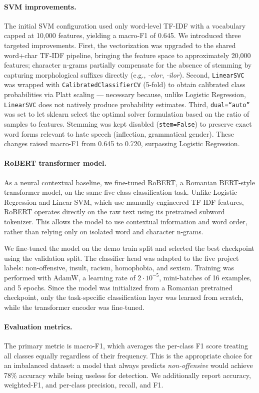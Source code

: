\paragraph{SVM improvements.}
The initial SVM configuration used only word-level TF-IDF with a vocabulary capped at 10,000 features, yielding a macro-F1 of 0.645. We introduced three targeted improvements. First, the vectorization was upgraded to the shared word+char TF-IDF pipeline, bringing the feature space to approximately 20,000 features; character n-grams partially compensate for the absence of stemming by capturing morphological suffixes directly (e.g., \textit{-elor}, \textit{-ilor}). Second, \texttt{LinearSVC} was wrapped with \texttt{CalibratedClassifierCV} (5-fold) to obtain calibrated class probabilities via Platt scaling — necessary because, unlike Logistic Regression, \texttt{LinearSVC} does not natively produce probability estimates. Third, \texttt{dual=``auto''} was set to let sklearn select the optimal solver formulation based on the ratio of samples to features. Stemming was kept disabled (\texttt{stem=False}) to preserve exact word forms relevant to hate speech (inflection, grammatical gender). These changes raised macro-F1 from 0.645 to 0.720, surpassing Logistic Regression.

\paragraph{RoBERT transformer model.}
As a neural contextual baseline, we fine-tuned RoBERT, a Romanian BERT-style transformer model, on the same five-class classification task. Unlike Logistic Regression and Linear SVM, which use manually engineered TF-IDF features, RoBERT operates directly on the raw text using its pretrained subword tokenizer. This allows the model to use contextual information and word order, rather than relying only on isolated word and character n-grams.

We fine-tuned the model on the demo train split and selected the best checkpoint using the validation split. The classifier head was adapted to the five project labels: non-offensive, insult, racism, homophobia, and sexism. Training was performed with AdamW, a learning rate of $2\cdot10^{-5}$, mini-batches of 16 examples, and 5 epochs. Since the model was initialized from a Romanian pretrained checkpoint, only the task-specific classification layer was learned from scratch, while the transformer encoder was fine-tuned.


\paragraph{Evaluation metrics.}
The primary metric is macro-F1, which averages the per-class F1 score treating all classes equally regardless of their frequency. This is the appropriate choice for an imbalanced dataset: a model that always predicts \textit{non-offensive} would achieve 78\% accuracy while being useless for detection. We additionally report accuracy, weighted-F1, and per-class precision, recall, and F1.

